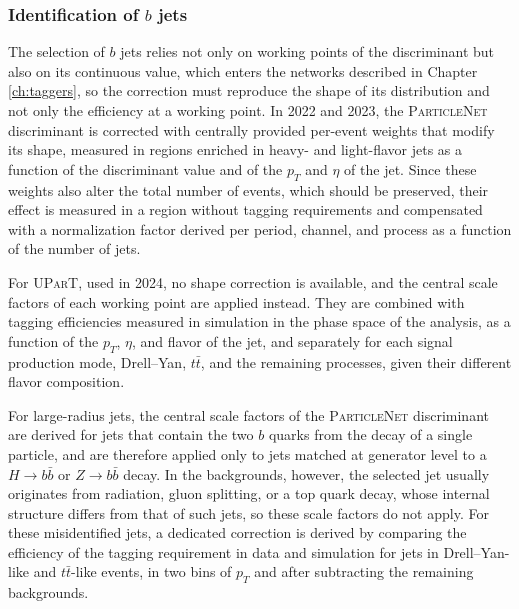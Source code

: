 \subsubsection{Identification of \texorpdfstring{$b$}{b} jets}
%
The selection of $b$ jets relies not only on working points of the discriminant but also on its continuous value, which enters the networks described in Chapter \ref{ch:taggers}, so the correction must reproduce the shape of its distribution and not only the efficiency at a working point. In 2022 and 2023, the \textsc{ParticleNet} discriminant is corrected with centrally provided per-event weights that modify its shape, measured in regions enriched in heavy- and light-flavor jets as a function of the discriminant value and of the $p_T$ and $\eta$ of the jet. Since these weights also alter the total number of events, which should be preserved, their effect is measured in a region without tagging requirements and compensated with a normalization factor derived per period, channel, and process as a function of the number of jets.

For \textsc{UParT}, used in 2024, no shape correction is available, and the central scale factors of each working point are applied instead. They are combined with tagging efficiencies measured in simulation in the phase space of the analysis, as a function of the $p_T$, $\eta$, and flavor of the jet, and separately for each signal production mode, Drell--Yan, $t\bar{t}$, and the remaining processes, given their different flavor composition.



For large-radius jets, the central scale factors of the \textsc{ParticleNet} discriminant are derived for jets that contain the two $b$ quarks from the decay of a single particle, and are therefore applied only to jets matched at generator level to a $H\to b\bar{b}$ or $Z\to b\bar{b}$ decay. In the backgrounds, however, the selected jet usually originates from radiation, gluon splitting, or a top quark decay, whose internal structure differs from that of such jets, so these scale factors do not apply. For these misidentified jets, a dedicated correction is derived by comparing the efficiency of the tagging requirement in data and simulation for jets in Drell--Yan-like and $t\bar{t}$-like events, in two bins of $p_T$ and after subtracting the remaining backgrounds.



